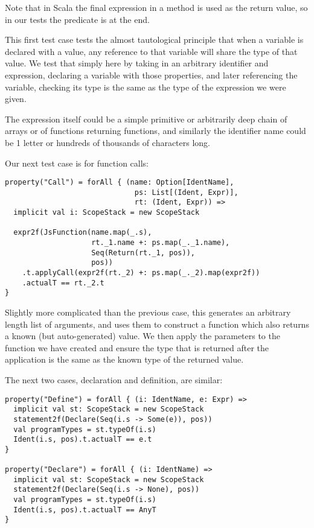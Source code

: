\documentclass[british, twoside]{bhamthesis}
\theoremstyle{definition}
\begin{document}
      Note that in Scala the final expression in a method is used as the return value, so in our tests the predicate is at the end.

      This first test case tests the almost tautological principle that when a variable is declared with a value, any reference to that variable will share the type of that value. We test that simply here by taking in an arbitrary identifier and expression, declaring a variable with those properties, and later referencing the variable, checking its type is the same as the type of the expression we were given.

      The expression itself could be a simple primitive or arbitrarily deep chain of arrays or of functions returning functions, and similarly the identifier name could be 1 letter or hundreds of thousands of characters long.

      Our next test case is for function calls:

      \begin{lstlisting}
property("Call") = forAll { (name: Option[IdentName],
                              ps: List[(Ident, Expr)],
                              rt: (Ident, Expr)) =>
  implicit val i: ScopeStack = new ScopeStack

  expr2f(JsFunction(name.map(_.s),
                    rt._1.name +: ps.map(_._1.name),
                    Seq(Return(rt._1, pos)),
                    pos))
    .t.applyCall(expr2f(rt._2) +: ps.map(_._2).map(expr2f))
    .actualT == rt._2.t
}
      \end{lstlisting}

      Slightly more complicated than the previous case, this generates an arbitrary length list of arguments, and uses them to construct a function which also returns a known (but auto-generated) value. We then apply the parameters to the function we have created and ensure the type that is returned after the application is the same as the known type of the returned value.

      The next two cases, declaration and definition, are similar:

      \begin{lstlisting}
property("Define") = forAll { (i: IdentName, e: Expr) =>
  implicit val st: ScopeStack = new ScopeStack
  statement2f(Declare(Seq(i.s -> Some(e)), pos))
  val programTypes = st.typeOf(i.s)
  Ident(i.s, pos).t.actualT == e.t
}

property("Declare") = forAll { (i: IdentName) =>
  implicit val st: ScopeStack = new ScopeStack
  statement2f(Declare(Seq(i.s -> None), pos))
  val programTypes = st.typeOf(i.s)
  Ident(i.s, pos).t.actualT == AnyT
}
      \end{lstlisting}
\end{document}
